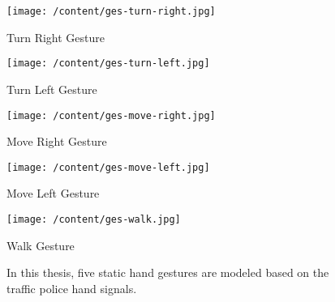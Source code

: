 \begin{figure}
	\centering 
	\begin{minipage}
		{.45 
			\textwidth} \centering 
		\texttt{[image: /content/ges-turn-right.jpg]} \caption{Turn Right Gesture} \label{fg:ges:3} 
	\end{minipage}
	\begin{minipage}
		{.45 
		\textwidth} \centering 
		\texttt{[image: /content/ges-turn-left.jpg]} \caption{Turn Left Gesture} \label{fg:ges:2} 
	\end{minipage}
	\begin{minipage}
		{.45 
		\textwidth} \centering 
		\texttt{[image: /content/ges-move-right.jpg]} \caption{Move Right Gesture} \label{fg:ges:5} 
	\end{minipage}
	\begin{minipage}
		{.45 
			\textwidth} \centering 
		\texttt{[image: /content/ges-move-left.jpg]} \caption{Move Left Gesture} \label{fg:ges:4} 
	\end{minipage}
	\begin{minipage}
		{.45 
		\textwidth} \centering 
		\texttt{[image: /content/ges-walk.jpg]} \caption{Walk Gesture} \label{fg:ges:1} 
	\end{minipage}	

	\caption{In this thesis, five static hand gestures are modeled based on the traffic police hand signals. \cite{22} }
	\label{fg:ges:hands} 
\end{figure}

